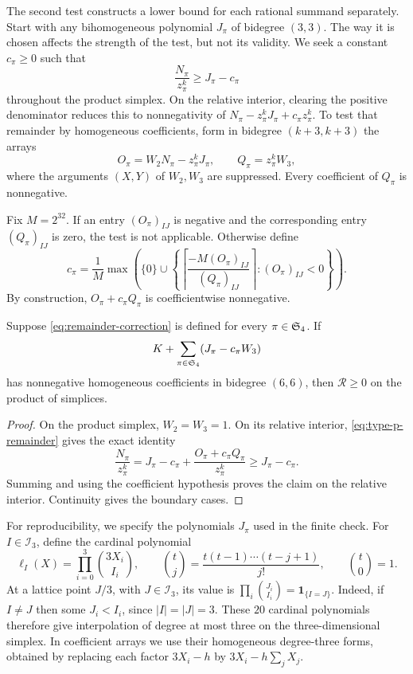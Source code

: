 The second test constructs a lower bound for each rational summand
separately. Start with any bihomogeneous polynomial $J_\pi$ of bidegree $(3,3)$.
The way it is chosen affects the strength of the test, but not its
validity. We seek a constant $c_\pi\ge0$ such that
\[
 \frac{N_\pi}{z_\pi^k}\ge J_\pi-c_\pi
\]
throughout the product simplex. On the relative interior, clearing the positive
denominator reduces this to nonnegativity of
$N_\pi-z_\pi^kJ_\pi+c_\pi z_\pi^k$.
To test that remainder by homogeneous coefficients, form in bidegree
$(k+3,k+3)$ the arrays
\begin{equation}
 O_\pi=W_2N_\pi-z_\pi^kJ_\pi,\qquad
 Q_\pi=z_\pi^kW_3,
 \label{eq:type-p-remainder}
\end{equation}
where the arguments $(X,Y)$ of $W_2,W_3$ are suppressed.
Every coefficient of $Q_\pi$ is nonnegative.

Fix $M=2^{32}$. If an entry $(O_\pi)_{IJ}$ is negative and the
corresponding entry $(Q_\pi)_{IJ}$ is zero, the test is not
applicable. Otherwise define
\begin{equation}
 c_\pi=\frac1M\max\left(
  \{0\}\cup
  \left\{
   \left\lceil\frac{-M(O_\pi)_{IJ}}{(Q_\pi)_{IJ}}\right\rceil:
   (O_\pi)_{IJ}<0
  \right\}\right).
 \label{eq:remainder-correction}
\end{equation}
By construction, $O_\pi+c_\pi Q_\pi$ is coefficientwise
nonnegative.

\begin{lemma}
\label{lem:type-p}
Suppose \eqref{eq:remainder-correction} is defined for every
$\pi\in\mathfrak S_4$. If
\begin{equation}
 K+\sum_{\pi\in\mathfrak S_4}(J_\pi-c_\pi W_3)
 \label{eq:type-p-polynomial}
\end{equation}
has nonnegative homogeneous coefficients in bidegree $(6,6)$,
then $\mathcal R\ge0$ on the product of simplices.
\end{lemma}

\begin{proof}
On the product simplex, $W_2=W_3=1$. On its relative interior,
\eqref{eq:type-p-remainder} gives the exact identity
\[
 \frac{N_\pi}{z_\pi^k}
 =J_\pi-c_\pi+
   \frac{O_\pi+c_\pi Q_\pi}{z_\pi^k}
 \ge J_\pi-c_\pi.
\]
Summing and using the coefficient hypothesis proves the claim on the
relative interior. Continuity gives the boundary cases.
\end{proof}

For reproducibility, we specify the polynomials $J_\pi$ used in the
finite check. For $I\in\mathcal I_3$, define the cardinal polynomial
\[
 \ell_I(X)=\prod_{i=0}^3\binom{3X_i}{I_i},\qquad
 \binom{t}{j}=\frac{t(t-1)\cdots(t-j+1)}{j!},\qquad
 \binom{t}{0}=1.
\]
At a lattice point $J/3$, with $J\in\mathcal I_3$, its value is
$\prod_i\binom{J_i}{I_i}=\mathbf 1_{\{I=J\}}$. Indeed, if $I\ne J$
then some $J_i<I_i$, since $|I|=|J|=3$. These $20$ cardinal
polynomials therefore give interpolation of degree at most three
on the three-dimensional simplex. In coefficient arrays we use
their homogeneous degree-three forms, obtained by replacing each
factor $3X_i-h$ by $3X_i-h\sum_jX_j$.

